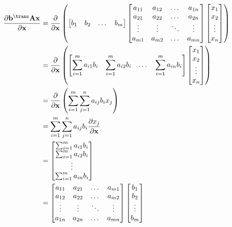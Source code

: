\begin{align}
    \dfrac{\partial \mathbf{b}^\trans \mathbf{A} \mathbf{x}}{\partial \mathbf{x}} &= \dfrac{\partial}{\partial \mathbf{x}} \left(
    \begin{bmatrix}
        b_{1} & b_{2} & \dots & b_{m}
    \end{bmatrix}
    \begin{bmatrix}
        a_{11} & a_{12} & \dots & a_{1n} \\
        a_{21} & a_{22} & \dots & a_{2n} \\
        \vdots & \vdots & \ddots & \vdots \\
        a_{m1} & a_{m2} & \dots & a_{mn} \\
    \end{bmatrix} \begin{bmatrix}
        x_{1} \\ x_{2} \\ \vdots \\ x_{n}
    \end{bmatrix} \right) \\
    &= \dfrac{\partial}{\partial \mathbf{x}} \left(
			\begin{bmatrix}
				\displaystyle \sum_{i = 1}^{m} a_{i1}b_{i} & 
				\displaystyle \sum_{i = 1}^{m} a_{i2}b_{i} & 
				\dots & 
				\displaystyle \sum_{i = 1}^{m} a_{in}b_{i}
			\end{bmatrix} \begin{bmatrix}
				x_{1} \\ x_{2} \\ \vdots \\ x_{n}
			\end{bmatrix} \right) \\
    &= \dfrac{\partial}{\partial \mathbf{x}} \left(
        \sum_{i = 1}^{m}\sum_{j = 1}^{n} a_{ij} b_{i} x_{j}
    \right) \\
    &= \sum_{i = 1}^{m}\sum_{j = 1}^{n} a_{ij} b_{i} \dfrac{\partial x_{j}}{\partial \mathbf{x}} \\
    &= \begin{bmatrix}
        \sum_{i = 1}^{m} a_{i1} b_{i} \\
        \sum_{i = 1}^{m} a_{i2} b_{i} \\
        \vdots \\
        \sum_{i = 1}^{m} a_{in} b_{i} \\
    \end{bmatrix} \\
    &= \begin{bmatrix}
        a_{11} & a_{21} & \dots & a_{m1} \\
        a_{12} & a_{22} & \dots & a_{m2} \\
        \vdots & \vdots & \ddots & \vdots \\
        a_{1n} & a_{2n} & \dots & a_{mn} \\
    \end{bmatrix}
    \begin{bmatrix}
        b_1 \\
        b_2 \\
        \vdots \\
        b_m
    \end{bmatrix}
\end{align}
